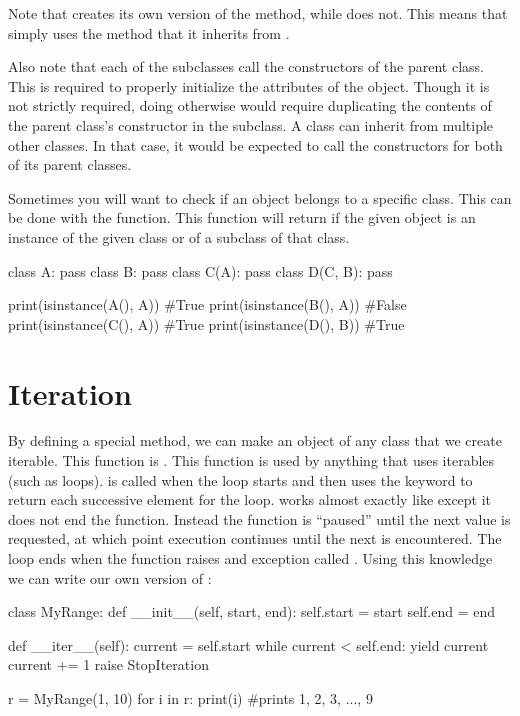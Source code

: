 \documentclass[11pt]{cselabheader}
\begin{document}
Note that  creates its own version of the
 method, while  does not. This means
that  simply uses the method that it inherits from
.

Also note that each of the subclasses call the constructors of the parent class.
This is required to properly initialize the attributes of the object. Though it
is not strictly required, doing otherwise would require duplicating the
contents of the parent class's constructor in the subclass. A class can inherit
from multiple other classes. In that case, it would be expected to call the
constructors for both of its parent classes.

Sometimes you will want to check if an object belongs to a specific class. This
can be done with the  function. This function will
return  if the given object is an instance of the given class
or of a subclass of that class.

\begin{python3code}
class A:
    pass
class B:
    pass
class C(A):
    pass
class D(C, B):
    pass

print(isinstance(A(), A)) #True
print(isinstance(B(), A)) #False
print(isinstance(C(), A)) #True
print(isinstance(D(), B)) #True
\end{python3code}

\section{Iteration}
\label{sec:iter}
By defining a special method, we can make an object of any class that
we create iterable. This function is .
This function is used by anything that uses
iterables (such as  loops).  is called
when the loop starts and then uses the  keyword to return
each successive element for the loop.  works almost exactly
like  except it does not end the function. Instead the function
is ``paused''
until the next value is requested, at which point execution continues until the
next  is encountered. The loop ends when the function raises
and exception called .
Using this knowledge we can write our
own version of :

\begin{python3code}
class MyRange:
    def __init__(self, start, end):
        self.start = start
        self.end = end

    def __iter__(self):
        current = self.start
        while current < self.end:
            yield current
            current += 1
        raise StopIteration

r = MyRange(1, 10)
for i in r:
    print(i) #prints 1, 2, 3, ..., 9
\end{python3code}
\end{document}
